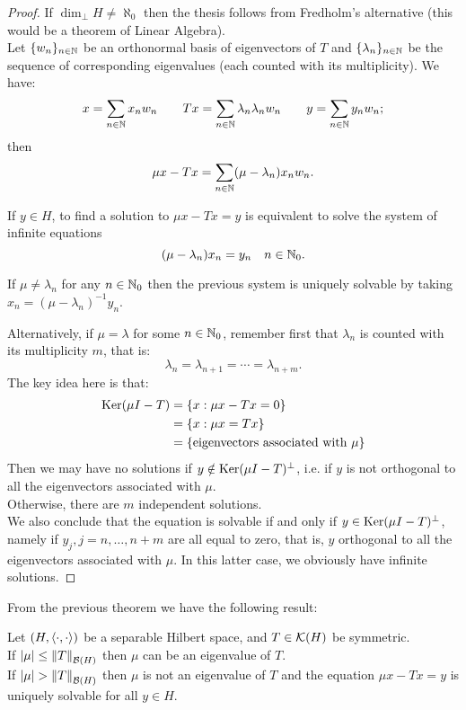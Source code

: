 \begin{proof}
	If $\dim_\perp H \neq \aleph_0$ then the thesis follows from Fredholm's alternative (this would be a theorem of Linear Algebra).\\
	
	Let $\{w_n\}_{n \in \mathbb N}$ be an orthonormal basis of eigenvectors of $T$ and $\{\lambda_n\}_{n \in \mathbb N}$ be the sequence of corresponding eigenvalues (each counted with its multiplicity). We have:
	$$
		x
		=\sum_{n \in \mathbb N}x_n w_n 
		\qquad 
		Tx 
		= \sum_{n\in\mathbb N} \lambda_n \lambda_n w_n 
		\qquad 
		y 
		= \sum_{n \in \mathbb N} y_n w_n
		;
	$$
	then
	$$ 
		\mu x - Tx 
		=\sum_{n \in\mathbb N}(\mu - \lambda_n) x_n w_n
		.
	$$
	
	If $y \in H$, to find a solution to $\mu x - Tx = y$ is equivalent to solve the system of infinite equations 
	$$
		(\mu- \lambda_n) x_n
		= y_n
		\quad
		n \in \mathbb N_0
		.
	$$
	
	If $\mu \neq \lambda_n$ for any $n \in \mathbb N_0$ then the previous system is uniquely solvable by taking $x_n = (\mu - \lambda_n)^{-1}y_n$.
	
	Alternatively, if $\mu = \lambda$ for some $n \in \mathbb N_0$, remember first that $\lambda_n$ is counted with its multiplicity $m$, that is:
	$$
		\lambda_n 
		= \lambda_{n+1} 
		= \cdots
		= \lambda_{n+m}.
	$$
	The key idea here is that:
	\begin{align*}
		\operatorname{Ker}(\mu I-T) &= \{x:\mu x - Tx = 0\}\\
					&= \{ x: \mu x = Tx \}\\
					&= \{\text{eigenvectors associated with }\mu\}
	\end{align*}
	Then we may have no solutions if $ y \notin \operatorname{Ker} (\mu I - T)^\perp$, i.e. if $y$ is not orthogonal to all the eigenvectors associated with $\mu$.\\
	Otherwise, there are $m$ independent solutions.\\
	We also conclude that the equation is solvable if and only if $y \in \operatorname{Ker} (\mu I - T)^\perp$, namely if $y_j,j=n,\ldots,n+m$ are all equal to zero, that is, $y$ orthogonal to all the eigenvectors associated with $\mu$. In this latter case, we obviously have infinite solutions.
\end{proof}

From the previous theorem we have the following result:
\begin{prop}
	Let $(H,\left\langle\cdot, \cdot\right\rangle )$ be a separable Hilbert space, and $T \in \mathcal K(H)$ be symmetric.\\
	If $|\mu| \leq \left\lVert T\right\rVert_{\mathcal B(H)}$ then $\mu$ can be an eigenvalue of $T$.\\
	If $|\mu| > \left\lVert T\right\rVert_{\mathcal B(H)}$ then $\mu$ is not an eigenvalue of $T$ and the equation $\mu x - T x = y$ is uniquely solvable for all $y \in H$.
\end{prop}

